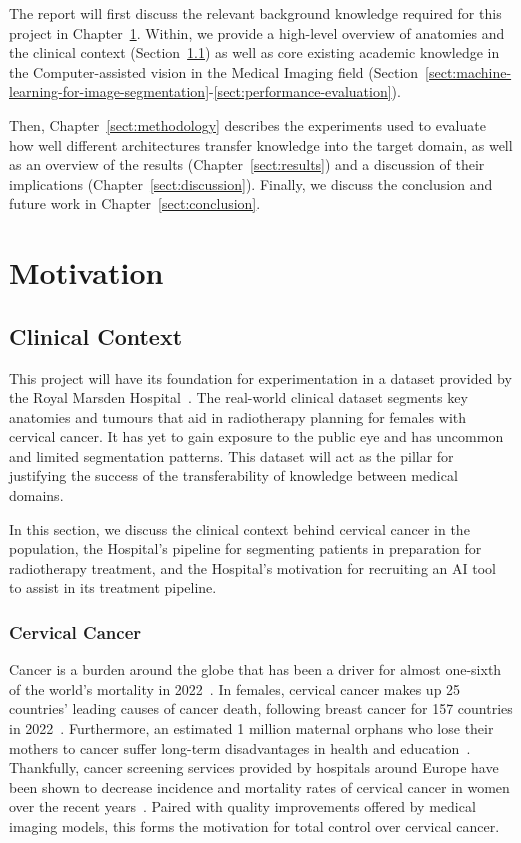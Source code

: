 \documentclass[12pt,twoside]{report}
\begin{document}
The report will first discuss the relevant background knowledge required for this project in Chapter~\ref{sect:motivation}. Within, we provide a high-level overview of anatomies and the clinical context (Section~\ref{sect:clinical-context}) as well as core existing academic knowledge in the Computer-assisted vision in the Medical Imaging field (Section~\ref{sect:machine-learning-for-image-segmentation}-\ref{sect:performance-evaluation}). 

Then, Chapter~\ref{sect:methodology} describes the experiments used to evaluate how well different architectures transfer knowledge into the target domain, as well as an overview of the results (Chapter~\ref{sect:results}) and a discussion of their implications (Chapter~\ref{sect:discussion}). Finally, we discuss the conclusion and future work in Chapter~\ref{sect:conclusion}.

\chapter{Motivation}\label{sect:motivation}

\section{Clinical Context}\label{sect:clinical-context}

This project will have its foundation for experimentation in a dataset provided by the Royal Marsden Hospital~\cite{AMLART-data}. The real-world clinical dataset segments key anatomies and tumours that aid in radiotherapy planning for females with cervical cancer. It has yet to gain exposure to the public eye and has uncommon and limited segmentation patterns. This dataset will act as the pillar for justifying the success of the transferability of knowledge between medical domains.

In this section, we discuss the clinical context behind cervical cancer in the population, the Hospital's pipeline for segmenting patients in preparation for radiotherapy treatment, and the Hospital's motivation for recruiting an AI tool to assist in its treatment pipeline. 

\subsection{Cervical Cancer}\label{sect:cervical-cancer}

Cancer is a burden around the globe that has been a driver for almost one-sixth of the world's mortality in 2022~\cite{Global-cancer-2022}. In females, cervical cancer makes up 25 countries' leading causes of cancer death, following breast cancer for 157 countries in 2022~\cite{Global-cancer-2022}. Furthermore, an estimated 1 million maternal orphans who lose their mothers to cancer suffer long-term disadvantages in health and education~\cite{Guida2022}. Thankfully, cancer screening services provided by hospitals around Europe have been shown to decrease incidence and mortality rates of cervical cancer in women over the recent years~\cite{Global-cancer-2022}. Paired with quality improvements offered by medical imaging models, this forms the motivation for total control over cervical cancer.
\end{document}
